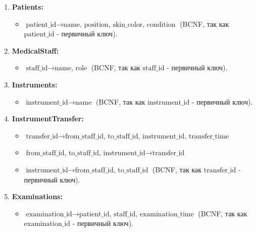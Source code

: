 \documentclass[14pt]{extreport}
\begin{document}
            \begin{enumerate}[label=\arabic*.]
                \item \textbf{Patients:}
                \begin{itemize}
                    \item $\text{patient\_id} \rightarrow \text{name, position, skin\_color, condition}$ (BCNF, так как $\text{patient\_id}$ - первичный ключ).
                \end{itemize}

                \item \textbf{MedicalStaff:}
                \begin{itemize}
                    \item $\text{staff\_id} \rightarrow \text{name, role}$ (BCNF, так как $\text{staff\_id}$ - первичный ключ).
                \end{itemize}

                \item \textbf{Instruments:}
                \begin{itemize}
                    \item $\text{instrument\_id} \rightarrow \text{name}$ (BCNF, так как $\text{instrument\_id}$ - первичный ключ).
                \end{itemize}

                \item \textbf{InstrumentTransfer:}
                \begin{itemize}
                    \item $\text{transfer\_id} \rightarrow \text{from\_staff\_id, to\_staff\_id, instrument\_id, transfer\_time}$
                    \item $\text{from\_staff\_id, to\_staff\_id, instrument\_id} \rightarrow \text{transfer\_id}$
                    \item $\text{instrument\_id} \rightarrow \text{from\_staff\_id, to\_staff\_id}$ (BCNF, так как $\text{transfer\_id}$ - первичный ключ).
                \end{itemize}

                \item \textbf{Examinations:}
                \begin{itemize}
                    \item $\text{examination\_id} \rightarrow \text{patient\_id, staff\_id, examination\_time}$ (BCNF, так как $\text{examination\_id}$ - первичный ключ).
                \end{itemize}
            \end{enumerate}
\end{document}
